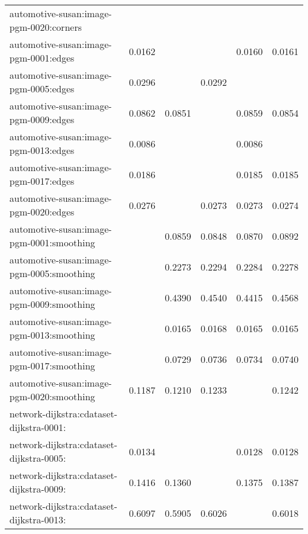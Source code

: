 \begin{longtable}{lrrrrr}
automotive-susan:image-pgm-0020:corners & \color{Green}{0.0101} & \color{Green}{0.0101} & \color{Green}{0.0101} & \color{Green}{0.0101} & \color{Green}{0.0101} \\
automotive-susan:image-pgm-0001:edges & 0.0162 & \color{Green}{0.0159} & \color{Green}{0.0159} & 0.0160 & 0.0161 \\
automotive-susan:image-pgm-0005:edges & 0.0296 & \color{Green}{0.0291} & 0.0292 & \color{Green}{0.0291} & \color{Green}{0.0291} \\
automotive-susan:image-pgm-0009:edges & 0.0862 & 0.0851 & \color{Green}{0.0849} & 0.0859 & 0.0854 \\
automotive-susan:image-pgm-0013:edges & 0.0086 & \color{Green}{0.0085} & \color{Green}{0.0085} & 0.0086 & \color{Green}{0.0085} \\
automotive-susan:image-pgm-0017:edges & 0.0186 & \color{Green}{0.0184} & \color{Green}{0.0184} & 0.0185 & 0.0185 \\
automotive-susan:image-pgm-0020:edges & 0.0276 & \color{Green}{0.0272} & 0.0273 & 0.0273 & 0.0274 \\
automotive-susan:image-pgm-0001:smoothing & \color{Green}{0.0842} & 0.0859 & 0.0848 & 0.0870 & 0.0892 \\
automotive-susan:image-pgm-0005:smoothing & \color{Green}{0.2230} & 0.2273 & 0.2294 & 0.2284 & 0.2278 \\
automotive-susan:image-pgm-0009:smoothing & \color{Green}{0.4338} & 0.4390 & 0.4540 & 0.4415 & 0.4568 \\
automotive-susan:image-pgm-0013:smoothing & \color{Green}{0.0162} & 0.0165 & 0.0168 & 0.0165 & 0.0165 \\
automotive-susan:image-pgm-0017:smoothing & \color{Green}{0.0718} & 0.0729 & 0.0736 & 0.0734 & 0.0740 \\
automotive-susan:image-pgm-0020:smoothing & 0.1187 & 0.1210 & 0.1233 & \color{Green}{0.1181} & 0.1242 \\
network-dijkstra:cdataset-dijkstra-0001: & \color{Green}{0.0000} & \color{Green}{0.0000} & \color{Green}{0.0000} & \color{Green}{0.0000} & \color{Green}{0.0000} \\
network-dijkstra:cdataset-dijkstra-0005: & 0.0134 & \color{Green}{0.0127} & \color{Green}{0.0127} & 0.0128 & 0.0128 \\
network-dijkstra:cdataset-dijkstra-0009: & 0.1416 & 0.1360 & \color{Green}{0.1354} & 0.1375 & 0.1387 \\
network-dijkstra:cdataset-dijkstra-0013: & 0.6097 & 0.5905 & 0.6026 & \color{Green}{0.5903} & 0.6018 \\

\end{longtable}
